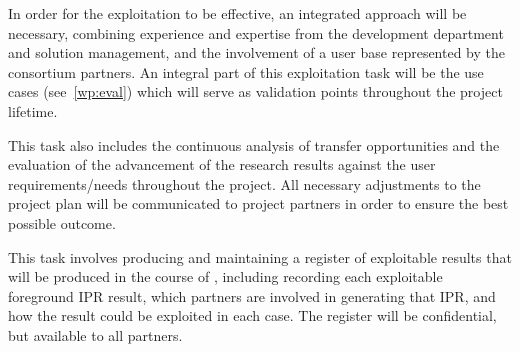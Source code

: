 \begin{Workpackage}{\thewpno}
\begin{Task}
In order for the exploitation to be effective, an integrated approach will be necessary, combining experience and expertise from the development department and solution management, and the involvement of a user base represented by the consortium partners.
An integral part of this exploitation task will be the \TheProject{} use cases (see~\ref{wp:eval}) which will serve as validation points throughout the project lifetime.

This task also includes the continuous analysis of transfer opportunities and the evaluation of the advancement of the research results against the user requirements/needs throughout the project.
All necessary adjustments to the project plan will be communicated to project partners  in order to ensure the best possible outcome.
\end{Task}

\begin{Task}


\TaskResults{%
\ref{del:dissemplan1};
\ref{del:dissemplan2}
}
\TaskHeader{}

This task involves producing and maintaining a register of exploitable results that will be produced in the course of \TheProject{}, including recording each exploitable foreground IPR result, which partners are involved in generating that IPR, and how the result could be exploited in each case.
The register will be confidential, but available to all partners.
\end{Task}


\end{Workpackage}
